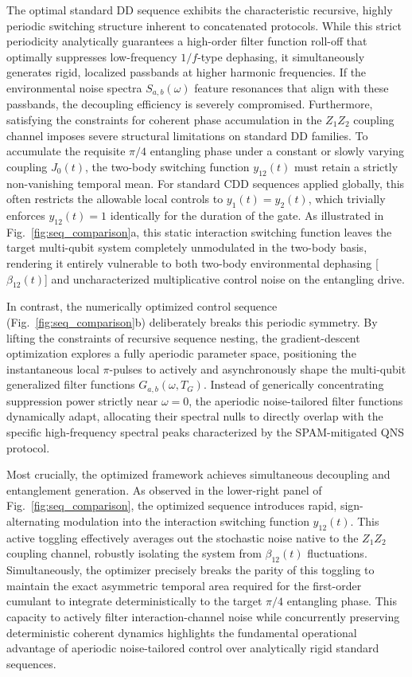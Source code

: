 \documentclass[%
 reprint,
superscriptaddress,
 amsmath,amssymb,
 aps,
pra,
]{revtex4-2}
\begin{document}
The optimal standard DD sequence exhibits the characteristic recursive, highly periodic switching structure inherent to concatenated protocols. While this strict periodicity analytically guarantees a high-order filter function roll-off that optimally suppresses low-frequency $1/f$-type dephasing, it simultaneously generates rigid, localized passbands at higher harmonic frequencies. If the environmental noise spectra $S_{a,b}(\omega)$ feature resonances that align with these passbands, the decoupling efficiency is severely compromised. Furthermore, satisfying the constraints for coherent phase accumulation in the $Z_1 Z_2$ coupling channel imposes severe structural limitations on standard DD families. To accumulate the requisite $\pi/4$ entangling phase under a constant or slowly varying coupling $J_0(t)$, the two-body switching function $y_{12}(t)$ must retain a strictly non-vanishing temporal mean. For standard CDD sequences applied globally, this often restricts the allowable local controls to $y_1(t) = y_2(t)$, which trivially enforces $y_{12}(t) = 1$ identically for the duration of the gate. As illustrated in Fig.~\ref{fig:seq_comparison}a, this static interaction switching function leaves the target multi-qubit system completely unmodulated in the two-body basis, rendering it entirely vulnerable to both two-body environmental dephasing [$\beta_{12}(t)$] and uncharacterized multiplicative control noise on the entangling drive.

In contrast, the numerically optimized control sequence (Fig.~\ref{fig:seq_comparison}b) deliberately breaks this periodic symmetry. By lifting the constraints of recursive sequence nesting, the gradient-descent optimization explores a fully aperiodic parameter space, positioning the instantaneous local $\pi$-pulses to actively and asynchronously shape the multi-qubit generalized filter functions $G_{a,b}(\omega, T_G)$. Instead of generically concentrating suppression power strictly near $\omega = 0$, the aperiodic noise-tailored filter functions dynamically adapt, allocating their spectral nulls to directly overlap with the specific high-frequency spectral peaks characterized by the SPAM-mitigated QNS protocol.

Most crucially, the optimized framework achieves simultaneous decoupling and entanglement generation. As observed in the lower-right panel of Fig.~\ref{fig:seq_comparison}, the optimized sequence introduces rapid, sign-alternating modulation into the interaction switching function $y_{12}(t)$. This active toggling effectively averages out the stochastic noise native to the $Z_1 Z_2$ coupling channel, robustly isolating the system from $\beta_{12}(t)$ fluctuations. Simultaneously, the optimizer precisely breaks the parity of this toggling to maintain the exact asymmetric temporal area required for the first-order cumulant to integrate deterministically to the target $\pi/4$ entangling phase. This capacity to actively filter interaction-channel noise while concurrently preserving deterministic coherent dynamics highlights the fundamental operational advantage of aperiodic noise-tailored control over analytically rigid standard sequences.
\end{document}
